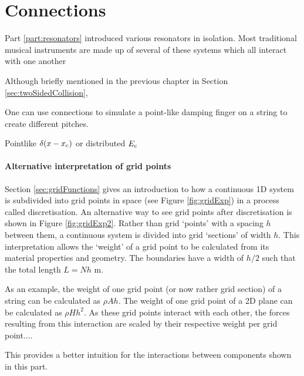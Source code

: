 \chapter{Connections}\label{ch:connections}
Part \ref{part:resonators} introduced various resonators in isolation. Most traditional musical instruments are made up of several of these systems which all interact with one another

Although briefly mentioned in the previous chapter in Section \ref{sec:twoSidedCollision}, 

One can use connections to simulate a point-like damping finger on a string to create different pitches.

Pointlike $\delta(x-x_{\text{c}})$ or distributed $E_{\text{c}}$
\subsubsection{Alternative interpretation of grid points}
Section \ref{sec:gridFunctions} gives an introduction to how a continuous 1D system is subdivided into grid points in space (see Figure \ref{fig:gridExp}) in a process called discretisation. An alternative way to see grid points after discretisation is shown in Figure \ref{fig:gridExp2}. Rather than grid `points' with a spacing $h$ between them, a continuous system is divided into grid `sections' of width $h$. This interpretation allows the `weight' of a grid point to be calculated from its material properties and geometry. The boundaries have a width of $h/2$ such that the total length $L = Nh$ m.

As an example, the weight of one grid point (or now rather grid section) of a string can be calculated as $\rho A h$. The weight of one grid point of a 2D plane can be calculated as $\rho H h^2$. As these grid points interact with each other, the forces resulting from this interaction are scaled by their respective weight per grid point....

This provides a better intuition for the interactions between components shown in this part. 

